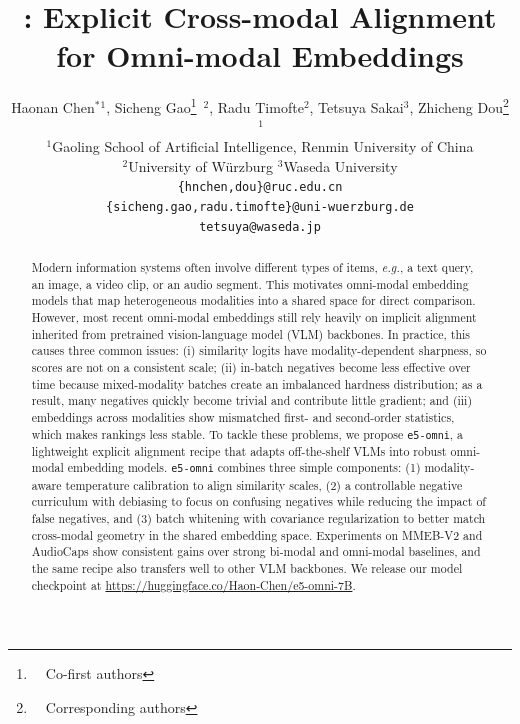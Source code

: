 \documentclass[11pt]{article}
\title{\ours{}: Explicit Cross-modal Alignment for Omni-modal Embeddings}
\author{Haonan Chen$^*$$^{1}$, Sicheng Gao\thanks{\ \ Co-first authors} \,$^{2}$, Radu Timofte$^{2}$, Tetsuya Sakai$^{3}$, Zhicheng Dou\thanks{\ \ Corresponding authors} \,$^{1}$ \\
         $^1$Gaoling School of Artificial Intelligence, Renmin University of China \\ 
         $^2$University of Würzburg $^3$Waseda University  \\ 
         \texttt{\{hnchen,dou\}@ruc.edu.cn} \\
        \texttt{\{sicheng.gao,radu.timofte\}@uni-wuerzburg.de} \\
         \texttt{tetsuya@waseda.jp} \\
}
\newcommand{\eg}{\textit{e.g.}}
\newcommand{\ours}{\texttt{e5-omni}}
\begin{document}
\maketitle

\begin{abstract}
Modern information systems often involve different types of items, \eg, a text query, an image, a video clip, or an audio segment.
This motivates omni-modal embedding models that map heterogeneous modalities into a shared space for direct comparison.
However, most recent omni-modal embeddings still rely heavily on implicit alignment inherited from pretrained vision-language model (VLM) backbones.
In practice, this causes three common issues:
(i) similarity logits have modality-dependent sharpness, so scores are not on a consistent scale;
(ii) in-batch negatives become less effective over time because mixed-modality batches create an imbalanced hardness distribution; as a result, many negatives quickly become trivial and contribute little gradient; and
(iii) embeddings across modalities show mismatched first- and second-order statistics, which makes rankings less stable.
To tackle these problems, we propose \ours{}, a lightweight explicit alignment recipe that adapts off-the-shelf VLMs into robust omni-modal embedding models.
\ours{} combines three simple components:
(1) modality-aware temperature calibration to align similarity scales,
(2) a controllable negative curriculum with debiasing to focus on confusing negatives while reducing the impact of false negatives, and
(3) batch whitening with covariance regularization to better match cross-modal geometry in the shared embedding space.
Experiments on MMEB-V2 and AudioCaps show consistent gains over strong bi-modal and omni-modal baselines, and the same recipe also transfers well to other VLM backbones.
We release our model checkpoint at \url{https://huggingface.co/Haon-Chen/e5-omni-7B}.


\end{abstract}










\appendix


\end{document}
